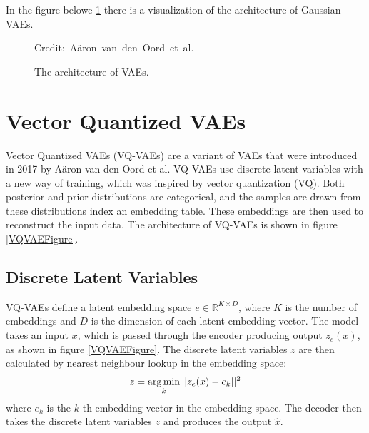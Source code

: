 In the figure belowe \ref{VAEFigure} there is a visualization of the architecture of Gaussian VAEs.


\begin{figure}[H]
    \centering

    \caption{ The architecture of VAEs.}
  	\medskip 
	\hspace*{15pt}\hbox{\scriptsize Credit: Aäron van den Oord et al.}
    \label{VAEFigure}
\end{figure}

\section{Vector Quantized VAEs}

Vector Quantized VAEs (VQ-VAEs) are a variant of VAEs that were introduced in 2017 by Aäron van den Oord et al\cite{vqvae}. VQ-VAEs use discrete latent variables with a new way of training, which was inspired by vector quantization (VQ). Both posterior and prior distributions are categorical, and the samples are drawn from these distributions index an embedding table\cite{vqvae}. These embeddings are then used to reconstruct the input data. The architecture of VQ-VAEs is shown in figure \ref{VQVAEFigure}.

\subsection {Discrete Latent Variables}

VQ-VAEs define a latent embedding space $ e \in \mathbb{R}^{K \times D} $, where $K$ is the number of embeddings and $D$ is the dimension of each latent embedding vector. The model takes an input $x$, which is passed through the encoder producing output $z_e(x)$, as shown in figure \ref{VQVAEFigure}. 
The discrete latent variables $z$ are then calculated by nearest neighbour lookup in the embedding space: \[ z = \operatorname*{arg\,min}_{k} || z_e(x) - e_k ||^2 \] where $e_k$ is the $k$-th embedding vector in the embedding space. The decoder then takes the discrete latent variables $z$ and produces the output $\hat{x}$.

